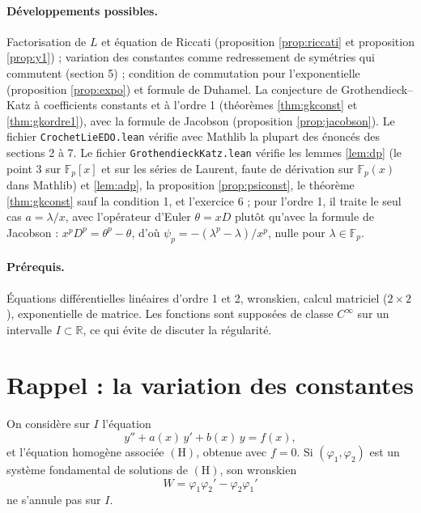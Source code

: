 \documentclass[11pt,a4paper]{article}
\theoremstyle{plain}
\theoremstyle{definition}
\theoremstyle{remark}
\newcommand{\R}{\mathbb{R}}
\newcommand{\F}{\mathbb{F}}
\newcommand{\Dx}{D}
\begin{document}
\paragraph{Développements possibles.} Factorisation de $L$ et équation de Riccati (proposition \ref{prop:riccati} et proposition \ref{prop:y1}) ; variation des constantes comme redressement de symétries qui commutent (section 5) ; condition de commutation pour l'exponentielle (proposition \ref{prop:expo}) et formule de Duhamel. La conjecture de Grothendieck--Katz à coefficients constants et à l'ordre 1 (théorèmes \ref{thm:gkconst} et \ref{thm:gkordre1}), avec la formule de Jacobson (proposition \ref{prop:jacobson}). Le fichier \texttt{CrochetLieEDO.lean} vérifie avec Mathlib la plupart des énoncés des sections 2 à 7. Le fichier \texttt{GrothendieckKatz.lean} vérifie les lemmes \ref{lem:dp} (le point 3 sur $\F_p[x]$ et sur les séries de Laurent, faute de dérivation sur $\F_p(x)$ dans Mathlib) et \ref{lem:adp}, la proposition \ref{prop:psiconst}, le théorème \ref{thm:gkconst} sauf la condition 1, et l'exercice 6 ; pour l'ordre 1, il traite le seul cas $a = \lambda/x$, avec l'opérateur d'Euler $\theta = x\Dx$ plutôt qu'avec la formule de Jacobson : $x^p\Dx^p = \theta^p - \theta$, d'où $\psi_p = -(\lambda^p - \lambda)/x^p$, nulle pour $\lambda \in \F_p$.

\paragraph{Prérequis.} Équations différentielles linéaires d'ordre 1 et 2, wronskien, calcul matriciel ($2\times 2$), exponentielle de matrice. Les fonctions sont supposées de classe $C^\infty$ sur un intervalle $I\subset\R$, ce qui évite de discuter la régularité.

\tableofcontents

\section{Rappel : la variation des constantes}

On considère sur $I$ l'équation
\begin{equation}\label{eq:E}
  y'' + a(x)\,y' + b(x)\,y = f(x), \tag{E}
\end{equation}
et l'équation homogène associée $(\mathrm{H})$, obtenue avec $f=0$. Si $(\varphi_1,\varphi_2)$ est un système fondamental de solutions de $(\mathrm{H})$, son wronskien
\[
  W = \varphi_1\varphi_2' - \varphi_2\varphi_1'
\]
ne s'annule pas sur $I$.
\end{document}
